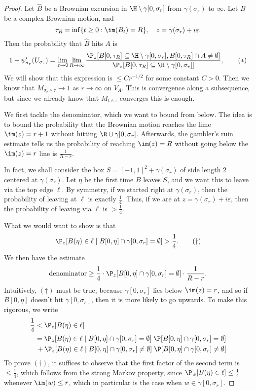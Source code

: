 \documentclass[a4paper]{article}
\begin{document}
\begin{proof}
  Let $\hat{B}$ be a Brownian excursion in $\H \setminus \gamma[0, \sigma_r]$ from $\gamma(\sigma_r)$ to $\infty$. Let $B$ be a complex Brownian motion, and
  \[
    \tau_R = \inf\{t \geq 0: \im(B_t) = R\},\quad z = \gamma(\sigma_r) + i\varepsilon.
  \]
  Then the probability that $\hat{B}$ hits $A$ is
  \[
    1 - \psi_{\sigma_r}'(U_{\sigma_r}) = \lim_{\varepsilon \to 0} \lim_{R \to \infty} \frac{\P_z [B[0, \tau_R] \subseteq \H \setminus \gamma[0, \sigma_r], B[0, \tau_R] \cap A \not= \emptyset]}{\P_z[B[0, \tau_R] \subseteq \H \setminus \gamma[0, \sigma_r]]},\tag{$*$}
  \]
  We will show that this expression is $\leq C r^{-1/2}$ for some constant $C > 0$. Then we know that $M_{\sigma_r \wedge \tau} \to 1$ as $r \to \infty$ on $V_A$. This is convergence along a subsequence, but since we already know that $M_{t \wedge \tau}$ converges this is enough.

  We first tackle the denominator, which we want to bound from below. The idea is to bound the probability that the Brownian motion reaches the lime $\im(z) = r + 1$ without hitting $\R \cup \gamma[0, \sigma_r]$. Afterwards, the gambler's ruin estimate tells us the probability of reaching $\im(z) = R$ without going below the $\im(z) = r$ line is $\frac{1}{R - r}$.

  In fact, we shall consider the box $S = [-1, 1]^2 + \gamma(\sigma_r)$ of side length $2$ centered at $\gamma(\sigma_r)$. Let $\eta$ be the first time $B$ leaves $S$, and we want this to leave via the top edge $\ell$. By symmetry, if we started right at $\gamma(\sigma_r)$, then the probability of leaving at $\ell$ is exactly $\frac{1}{4}$. Thus, if we are at $z = \gamma(\sigma_r) + i\varepsilon$, then the probability of leaving via $\ell$ is $> \frac{1}{4}$.

  What we would want to show is that
  \[
    \P_z[B(\eta) \in \ell \mid B[0, \eta] \cap \gamma[0, \sigma_r] = \emptyset] > \frac{1}{4}.\tag{$\dagger$}
  \]
  We then have the estimate
  \[
    \text{denominator} \geq \frac{1}{4}\cdot \P_z[B[0, \eta] \cap \gamma[0, \sigma_r] = \emptyset] \cdot \frac{1}{R - r}.
  \]
  Intuitively, $(\dagger)$ must be true, because $\gamma[0, \sigma_r]$ lies below $\im(z) = r$, and so if $B[0, \eta]$ doesn't hit $\gamma[0, \sigma_r]$, then it is more likely to go upwards. To make this rigorous, we write
  \begin{align*}
    \frac{1}{4} &< \P_z[B(\eta) \in \ell]\\
    &= \P_z[B(\eta) \in \ell \mid B[0, \eta] \cap \gamma[0, \sigma_r] = \emptyset]\; \P[B[0, \eta] \cap \gamma[0, \sigma_r] = \emptyset]\\
    &\,+\P_z[B(\eta) \in \ell \mid B[0, \eta] \cap \gamma[0, \sigma_r] \not= \emptyset]\;\P[ B[0, \eta] \cap \gamma[0, \sigma_r] \not= \emptyset]
  \end{align*}
  To prove $(\dagger)$, it suffices to observe that the first factor of the second term is $\leq \frac{1}{4}$, which follows from the strong Markov property, since $\P_w[B(\eta) \in \ell] \leq \frac{1}{4}$ whenever $\im(w)\leq r$, which in particular is the case when $w \in \gamma[0, \sigma_r]$.


\end{proof}
\end{document}
